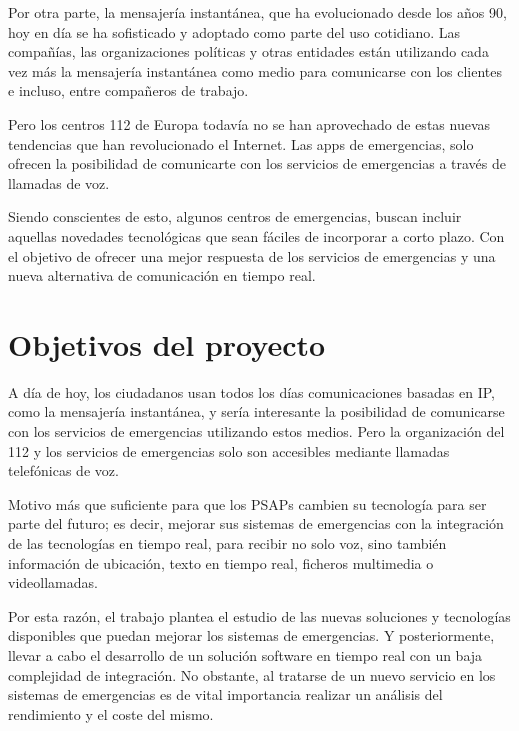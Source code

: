 Por otra parte, la mensajería instantánea, que ha evolucionado desde los años 90, hoy en día se ha sofisticado y adoptado como parte del uso cotidiano. Las compañías, las organizaciones políticas y otras entidades están utilizando cada vez más la mensajería instantánea como medio para comunicarse con los clientes e incluso, entre compañeros de trabajo.

Pero los centros 112 de Europa todavía no se han aprovechado de estas nuevas tendencias que han revolucionado el Internet. Las apps de emergencias, solo ofrecen la posibilidad de comunicarte con los servicios de emergencias a través de llamadas de voz.

Siendo conscientes de esto, algunos centros de emergencias, buscan incluir aquellas novedades tecnológicas que sean fáciles de incorporar a corto plazo. Con el objetivo de ofrecer una mejor respuesta de los servicios de emergencias y una nueva alternativa de comunicación en tiempo real.

\section{Objetivos del proyecto}

A día de hoy, los ciudadanos usan todos los días comunicaciones basadas en IP, como la mensajería instantánea, y sería interesante la posibilidad de comunicarse con los servicios de emergencias utilizando estos medios. Pero la organización del 112 y los servicios de emergencias solo son accesibles mediante llamadas telefónicas de voz.

Motivo más que suficiente para que los PSAPs cambien su tecnología para ser parte del futuro; es decir, mejorar sus sistemas de emergencias con la integración de las tecnologías en tiempo real, para recibir no solo voz, sino también información de ubicación, texto en tiempo real, ficheros multimedia o videollamadas.

Por esta razón, el trabajo plantea el estudio de las nuevas soluciones y tecnologías disponibles que puedan mejorar los sistemas de emergencias. Y posteriormente, llevar a cabo el desarrollo de un solución software en tiempo real con un baja complejidad de integración. No obstante, al tratarse de un nuevo servicio en los sistemas de emergencias es de vital importancia realizar un análisis del rendimiento y el coste del mismo.
